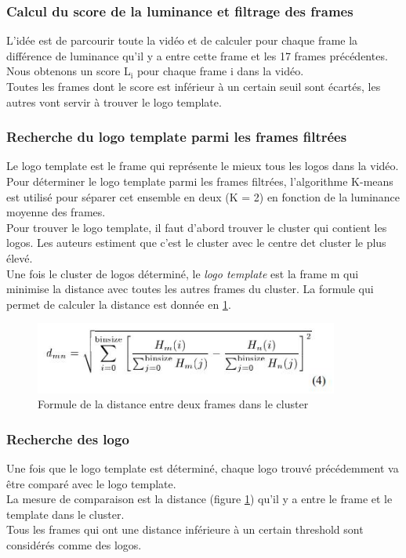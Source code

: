 \documentclass[11pt]{article}
\begin{document}
\subsubsection{Calcul du score de la luminance et filtrage des frames}
\label{sec:org4cb8c61}
L'idée est de parcourir toute la vidéo et de calculer pour chaque frame la différence de luminance qu'il y a entre cette frame et les 17 frames précédentes.\\
Nous obtenons un score L\(_{\text{i}}\) pour chaque frame i dans la vidéo.\\
Toutes les frames dont le score est inférieur à un certain seuil sont écartés, les autres vont servir à trouver le logo template.\\

\subsubsection{Recherche du logo template parmi les frames filtrées}
\label{sec:org83e2257}
Le logo template est le frame qui représente le mieux tous les logos dans la vidéo.\\
Pour déterminer le logo template parmi les frames filtrées, l'algorithme K-means est utilisé pour séparer cet ensemble en deux (K = 2) en fonction de la luminance moyenne des frames.\\
Pour trouver le logo template, il faut d'abord trouver le cluster qui contient les logos. Les auteurs estiment que c'est le cluster avec le centre det cluster le plus élevé.\\
Une fois le cluster de logos déterminé, le \emph{logo template} est la frame m qui minimise la distance avec toutes les autres frames du cluster. La formule qui permet de calculer la distance est donnée en \ref{calc-dist}.\\

\begin{figure}[htbp]
\centering
\includegraphics[width=10cm]{robust_calc_dist.JPG}
\caption{Formule de la distance entre deux frames dans le cluster \label{calc-dist}}
\end{figure}

\subsubsection{Recherche des logo}
\label{sec:org921adda}
Une fois que le logo template est déterminé, chaque logo trouvé précédemment va être comparé avec le logo template.\\
La mesure de comparaison est la distance (figure \ref{calc-dist}) qu'il y a entre le frame et le template dans le cluster.\\
Tous les frames qui ont une distance inférieure à un certain threshold sont considérés comme des logos.\\
\end{document}

